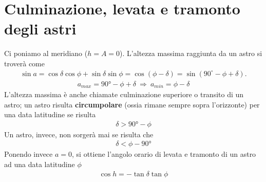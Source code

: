 \documentclass[a4paper, oneside]{book}
\begin{document}
\section {Culminazione, levata e tramonto degli astri}
Ci poniamo al meridiano ($h = A = 0$). L'altezza massima 
raggiunta da un astro si troverà come
\begin{gather*}
    \sin a = \cos\delta \cos\phi + \sin\delta \sin\phi = \cos(\phi - \delta) = \sin(90^{\circ} - \phi + \delta).
\end{gather*}
\begin{align}
    a_{max} = 90\text{°} - \phi + \delta \ \Longrightarrow \ a_{min} = \phi - \delta 
\end{align}
L'altezza massima è anche chiamate culminazione superiore o transito di un astro; un
astro risulta \textbf{circumpolare} (ossia rimane sempre sopra l'orizzonte) per
una data latitudine se risulta
\begin{gather*}
    \delta > 90\text{°} - \phi
\end{gather*}
Un astro, invece, non sorgerà mai se risulta che
\begin{gather*}
    \delta < \phi - 90\text{°}
\end{gather*}
Ponendo invece $a = 0$, si ottiene l'angolo orario di levata e tramonto di un astro 
ad una data latitudine $\phi$ 
\begin{align}
    \cos h = -\tan\delta \tan\phi
\end{align}

\clearpage
\end{document}
